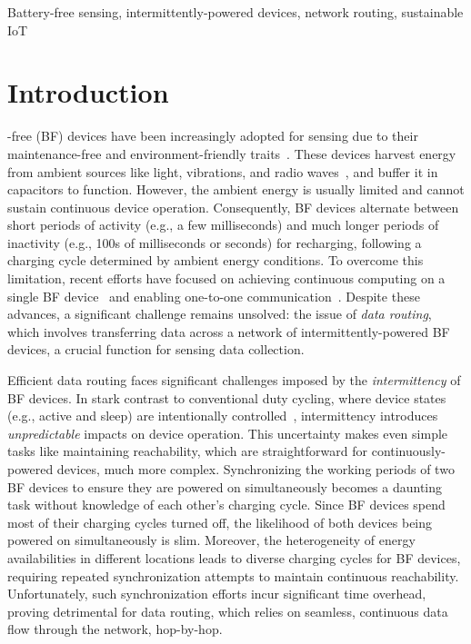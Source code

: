 \documentclass[lettersize,journal]{IEEEtran}
\begin{document}
\begin{IEEEkeywords}
Battery-free sensing, intermittently-powered devices, network routing, sustainable IoT
\end{IEEEkeywords}

\section{Introduction}
\label{sec:introduction}

-free (BF) devices have been increasingly adopted for sensing due to their maintenance-free and environment-friendly traits~\cite{2017-sensys-futureic,2017-snapl-survey,2022-tecs-camaroptera, 2018-mobicom-eyetracker,2021-weee-cic,2020-ipsn-cis,2020-sensys-bfsensing,2023-ipsn-riotee}. These devices harvest energy from ambient sources like light, vibrations, and radio waves~\cite{2017-imwut-bfphone,2020-imwut-bfgame,2018-asplos-energystore}, and buffer it in capacitors to function. However, the ambient energy is usually limited and cannot sustain continuous device operation. Consequently, BF devices alternate between short periods of activity (e.g., a few milliseconds) and much longer periods of inactivity (e.g., 100s of milliseconds or seconds) for recharging, following a charging cycle determined by ambient energy conditions. To overcome this limitation, recent efforts have focused on achieving continuous computing on a single BF device~\cite{2016-osdi-ratchet,2016-oopsla-chain, 2018-sensys-ink,2020-sensys-state,2020-pacmpl-foundation,2020-pldi-scheduling,2020-tecs-checkpoint,2020-asplos-tics,2020-imwut-bfree,2022-pldi-wario} and enabling one-to-one communication~\cite{2022-mobisys-bluetooth,2021-nsdi-find,2022-nsdi-bonito}. Despite these advances, a significant challenge remains unsolved: the issue of \emph{data routing}, which involves transferring data across a network of intermittently-powered BF devices, a crucial function for sensing data collection.

Efficient data routing faces significant challenges imposed by the \emph{intermittency} of BF devices. In stark contrast to conventional duty cycling, where device states (e.g., active and sleep) are intentionally controlled~\cite{2019-sigcomm-nd,2016-infocom-panda,2016-rtss-eh}, intermittency introduces \emph{unpredictable} impacts on device operation. This uncertainty makes even simple tasks like maintaining reachability, which are straightforward for continuously-powered devices, much more complex. Synchronizing the working periods of two BF devices to ensure they are powered on simultaneously becomes a daunting task without knowledge of each other's charging cycle. Since BF devices spend most of their charging cycles turned off, the likelihood of both devices being powered on simultaneously is slim. Moreover, the heterogeneity of energy availabilities in different locations leads to diverse charging cycles for BF devices, requiring repeated synchronization attempts to maintain continuous reachability. Unfortunately, such synchronization efforts incur significant time overhead, proving detrimental for data routing, which relies on seamless, continuous data flow through the network, hop-by-hop.
\end{document}
